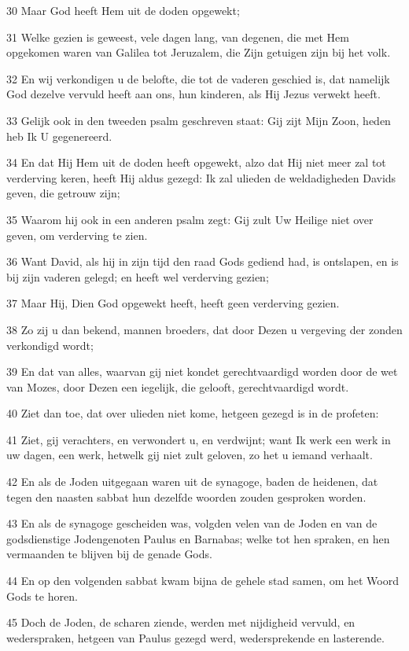 \par 30 Maar God heeft Hem uit de doden opgewekt;
\par 31 Welke gezien is geweest, vele dagen lang, van degenen, die met Hem opgekomen waren van Galilea tot Jeruzalem, die Zijn getuigen zijn bij het volk.
\par 32 En wij verkondigen u de belofte, die tot de vaderen geschied is, dat namelijk God dezelve vervuld heeft aan ons, hun kinderen, als Hij Jezus verwekt heeft.
\par 33 Gelijk ook in den tweeden psalm geschreven staat: Gij zijt Mijn Zoon, heden heb Ik U gegenereerd.
\par 34 En dat Hij Hem uit de doden heeft opgewekt, alzo dat Hij niet meer zal tot verderving keren, heeft Hij aldus gezegd: Ik zal ulieden de weldadigheden Davids geven, die getrouw zijn;
\par 35 Waarom hij ook in een anderen psalm zegt: Gij zult Uw Heilige niet over geven, om verderving te zien.
\par 36 Want David, als hij in zijn tijd den raad Gods gediend had, is ontslapen, en is bij zijn vaderen gelegd; en heeft wel verderving gezien;
\par 37 Maar Hij, Dien God opgewekt heeft, heeft geen verderving gezien.
\par 38 Zo zij u dan bekend, mannen broeders, dat door Dezen u vergeving der zonden verkondigd wordt;
\par 39 En dat van alles, waarvan gij niet kondet gerechtvaardigd worden door de wet van Mozes, door Dezen een iegelijk, die gelooft, gerechtvaardigd wordt.
\par 40 Ziet dan toe, dat over ulieden niet kome, hetgeen gezegd is in de profeten:
\par 41 Ziet, gij verachters, en verwondert u, en verdwijnt; want Ik werk een werk in uw dagen, een werk, hetwelk gij niet zult geloven, zo het u iemand verhaalt.
\par 42 En als de Joden uitgegaan waren uit de synagoge, baden de heidenen, dat tegen den naasten sabbat hun dezelfde woorden zouden gesproken worden.
\par 43 En als de synagoge gescheiden was, volgden velen van de Joden en van de godsdienstige Jodengenoten Paulus en Barnabas; welke tot hen spraken, en hen vermaanden te blijven bij de genade Gods.
\par 44 En op den volgenden sabbat kwam bijna de gehele stad samen, om het Woord Gods te horen.
\par 45 Doch de Joden, de scharen ziende, werden met nijdigheid vervuld, en wederspraken, hetgeen van Paulus gezegd werd, wedersprekende en lasterende.
